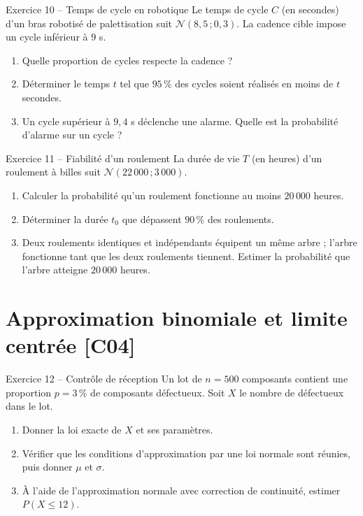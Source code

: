 \documentclass[a4paper,11pt]{article}
\begin{document}
\begin{exo}{Exercice 10 -- Temps de cycle en robotique}
Le temps de cycle $C$ (en secondes) d'un bras robotisé de palettisation suit $\mathcal{N}(8{,}5\,;0{,}3)$. La cadence cible impose un cycle inférieur à $9$ s.
\begin{enumerate}[label=\alph*)]
  \item Quelle proportion de cycles respecte la cadence ?
  \item Déterminer le temps $t$ tel que $95\,\%$ des cycles soient réalisés en moins de $t$ secondes.
  \item Un cycle supérieur à $9{,}4$ s déclenche une alarme. Quelle est la probabilité d'alarme sur un cycle ?
\end{enumerate}
\end{exo}

\begin{exo}{Exercice 11 -- Fiabilité d'un roulement}
La durée de vie $T$ (en heures) d'un roulement à billes suit $\mathcal{N}(22\,000\,;3\,000)$.
\begin{enumerate}[label=\alph*)]
  \item Calculer la probabilité qu'un roulement fonctionne au moins $20\,000$ heures.
  \item Déterminer la durée $t_0$ que dépassent $90\,\%$ des roulements.
  \item Deux roulements identiques et indépendants équipent un même arbre ; l'arbre fonctionne tant que les deux roulements tiennent. Estimer la probabilité que l'arbre atteigne $20\,000$ heures.
\end{enumerate}
\end{exo}

\section{Approximation binomiale et limite centrée \hfill {\normalsize\color{uimmred}[C04]}}

\begin{exo}{Exercice 12 -- Contrôle de réception}
Un lot de $n = 500$ composants contient une proportion $p = 3\,\%$ de composants défectueux. Soit $X$ le nombre de défectueux dans le lot.
\begin{enumerate}[label=\alph*)]
  \item Donner la loi exacte de $X$ et ses paramètres.
  \item Vérifier que les conditions d'approximation par une loi normale sont réunies, puis donner $\mu$ et $\sigma$.
  \item À l'aide de l'approximation normale avec correction de continuité, estimer $P(X \leq 12)$.
\end{enumerate}
\end{exo}
\end{document}

